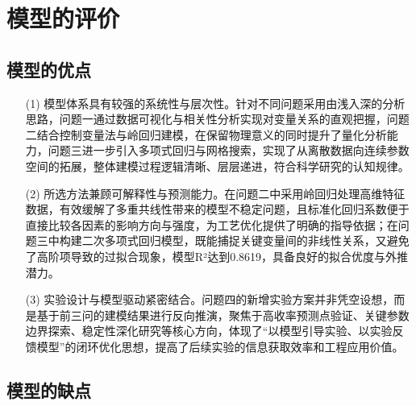 \section{模型的评价}

\subsection{模型的优点}%

\begin{itemize}
	
	\item[(1)] 模型体系具有较强的系统性与层次性。针对不同问题采用由浅入深的分析思路，问题一通过数据可视化与相关性分析实现对变量关系的直观把握，问题二结合控制变量法与岭回归建模，在保留物理意义的同时提升了量化分析能力，问题三进一步引入多项式回归与网格搜索，实现了从离散数据向连续参数空间的拓展，整体建模过程逻辑清晰、层层递进，符合科学研究的认知规律。
	
	\item[(2)] 所选方法兼顾可解释性与预测能力。在问题二中采用岭回归处理高维特征数据，有效缓解了多重共线性带来的模型不稳定问题，且标准化回归系数便于直接比较各因素的影响方向与强度，为工艺优化提供了明确的指导依据；在问题三中构建二次多项式回归模型，既能捕捉关键变量间的非线性关系，又避免了高阶项导致的过拟合现象，模型R²达到0.8619，具备良好的拟合优度与外推潜力。
	
	\item[(3)] 实验设计与模型驱动紧密结合。问题四的新增实验方案并非凭空设想，而是基于前三问的建模结果进行反向推演，聚焦于高收率预测点验证、关键参数边界探索、稳定性深化研究等核心方向，体现了“以模型引导实验、以实验反馈模型”的闭环优化思想，提高了后续实验的信息获取效率和工程应用价值。
	
\end{itemize}	

\subsection{模型的缺点}

